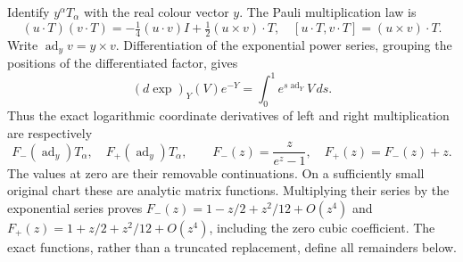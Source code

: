 Identify $y^\alpha T_\alpha$ with the real colour vector $y$.
The Pauli multiplication law is
\begin{equation}\label{eq:vertex-pauli}
 (u\cdot T)(v\cdot T)
       =-\tfrac14(u\cdot v)I+\tfrac12(u\times v)\cdot T,
 \quad [u\cdot T,v\cdot T]=(u\times v)\cdot T.
\end{equation}
Write $\operatorname{ad}_y v=y\times v$. Differentiation of the
exponential power series, grouping the positions of the differentiated
factor, gives
\[
 (d\exp)_Y(V)e^{-Y}=\int_0^1 e^{s\operatorname{ad}_Y}V\,ds.
\]
Thus the exact logarithmic coordinate derivatives of left and right
multiplication are respectively
\[
 F_-(\operatorname{ad}_y)T_\alpha,
 \quad F_+(\operatorname{ad}_y)T_\alpha,
 \qquad F_-(z)=\frac{z}{e^z-1},\quad F_+(z)=F_-(z)+z.
\]
The values at zero are their removable continuations. On a sufficiently
small original chart these are analytic matrix functions. Multiplying
their series by the exponential series proves
$F_-(z)=1-z/2+z^2/12+O(z^4)$ and
$F_+(z)=1+z/2+z^2/12+O(z^4)$, including the zero cubic coefficient.
The exact functions, rather than a truncated replacement, define all
remainders below.

